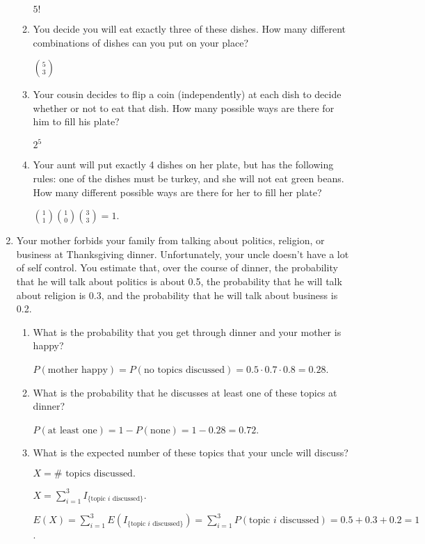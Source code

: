 \documentclass[11pt]{article}
\begin{document}
\begin{enumerate}
\begin{enumerate}
    {\color{red} $5!$}

    \item You decide you will eat exactly three of these dishes. How many different combinations of dishes can you put on your place?

    {\color{red} ${5 \choose 3}$}
    \item Your cousin decides to flip a coin (independently) at each dish to decide whether or not to eat that dish. How many possible ways are there for him to fill his plate?

    {\color{red} $2^5$}

    \item Your aunt will put exactly 4 dishes on her plate, but has the following rules: one of the dishes must be turkey, and she will not eat green beans. How many different possible ways are there for her to fill her plate?

    {\color{red} ${1 \choose 1}{1 \choose 0}{3 \choose 3} = 1$.}
\end{enumerate}

\item Your mother forbids your family from talking about politics, religion, or business at Thanksgiving dinner. Unfortunately, your uncle doesn't have a lot of self control. You estimate that, over the course of dinner, the probability that he will talk about politics is about 0.5, the probability that he will talk about religion is 0.3, and the probability that he will talk about business is 0.2.
\begin{enumerate}
\item What is the probability that you get through dinner and your mother is happy?

    {\color{red} $P(\textrm{mother happy}) = P(\textrm{no topics discussed}) = 0.5 \cdot 0.7 \cdot 0.8 = 0.28$.}
\item What is the probability that he discusses at least one of these topics at dinner?

    {\color{red} $P(\textrm{at least one}) = 1- P(\textrm{none}) = 1 - 0.28 = 0.72$.}
\item What is the expected number of these topics that your uncle will discuss?

    {\color{red} $X = \#\textrm{ topics discussed}.$

    $X = \sum_{i=1}^3 I_{\{\textrm{topic $i$ discussed}\}}$.

    $E(X) = \sum_{i=1}^3 E(I_{\{\textrm{topic $i$ discussed}\}}) = \sum_{i=1}^3 P(\textrm{topic $i$ discussed}) = 0.5 + 0.3 + 0.2 = 1$.}
    

\end{enumerate}
\end{enumerate}
\end{document}
